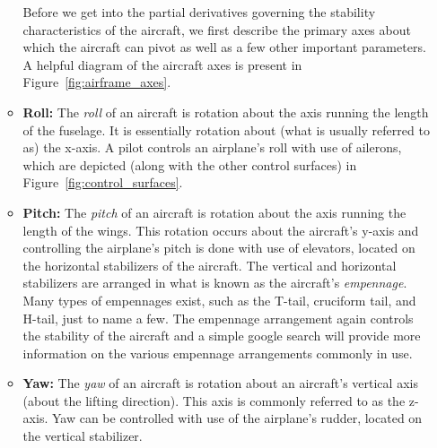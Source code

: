 \documentclass{article}
\begin{document}
\begin{itemize}
\begin{itemize}
            Before we get into the partial derivatives governing the stability characteristics of the aircraft, we first describe the primary axes about which the aircraft can pivot as well as a few other important parameters. A helpful diagram of the aircraft axes is present in Figure~\ref{fig:airframe_axes}.
            \item[] \textbf{Roll:} The \textit{roll} of an aircraft is rotation about the axis running the length of the fuselage. It is essentially rotation about (what is usually referred to as) the x-axis. A pilot controls an airplane's roll with use of ailerons, which are depicted (along with the other control surfaces) in Figure~\ref{fig:control_surfaces}.
            \item[] \textbf{Pitch:} The \textit{pitch} of an aircraft is rotation about the axis running the length of the wings. This rotation occurs about the aircraft's y-axis and controlling the airplane's pitch is done with use of elevators, located on the horizontal stabilizers of the aircraft. The vertical and horizontal stabilizers are arranged in what is known as the aircraft's \textit{empennage}. Many types of empennages exist, such as the T-tail, cruciform tail, and H-tail, just to name a few.
            The empennage arrangement again controls the stability of the aircraft and a simple google search will provide more information on the various empennage arrangements commonly in use. 
            \item[] \textbf{Yaw:} The \textit{yaw} of an aircraft is rotation about an aircraft's vertical axis (about the lifting direction). This axis is commonly referred to as the z-axis. Yaw can be controlled with use of the airplane's rudder, located on the vertical stabilizer. 
            

\end{itemize}
\end{itemize}
\end{document}

